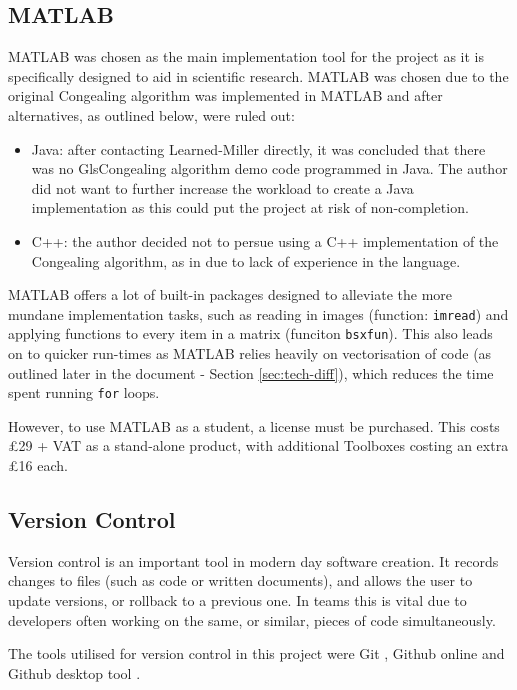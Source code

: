 \subsection{MATLAB}
\label{ssec:matlab}

MATLAB \cite{MATLAB:2016} was chosen as the main implementation tool for the project as it is specifically designed to aid in scientific research. MATLAB was chosen due to the original \Gls{Congealing} algorithm was implemented in MATLAB and after alternatives, as outlined below, were ruled out:

\begin{itemize}
  \item Java: after contacting Learned-Miller directly, it was concluded that there was no Gls{Congealing} algorithm demo code programmed in Java. The author did not want to further increase the workload to create a Java implementation as this could put the project at risk of non-completion.
  \item C++: the author decided not to persue using a C++ implementation of the \Gls{Congealing} algorithm, as in \cite{cpp_congealing} due to lack of experience in the language.
\end{itemize}

MATLAB offers a lot of built-in packages designed to alleviate the more mundane implementation tasks, such as reading in images (function: \texttt{imread}) and applying functions to every item in a matrix (funciton \texttt{bsxfun}). This also leads on to quicker run-times as MATLAB relies heavily on vectorisation of code (as outlined later in the document - Section \ref{sec:tech-diff}), which reduces the time spent running \texttt{for} loops.

However, to use MATLAB as a student, a license must be purchased. This costs \pounds29 + VAT as a stand-alone product, with additional Toolboxes costing an extra \pounds16 each.

\subsection{Version Control}

Version control is an important tool in modern day software creation. It records changes to files (such as code or written documents), and allows the user to update versions, or rollback to a previous one. In teams this is vital due to developers often working on the same, or similar, pieces of code simultaneously.

The tools utilised for version control in this project were Git \cite{2014gits}, Github online \cite{github} and Github desktop tool \cite{github_desktop}.

